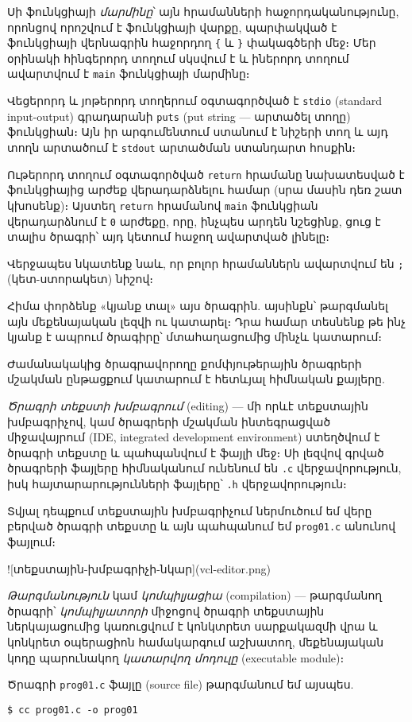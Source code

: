 Սի ֆունկցիայի \emph{մարմինը}՝ այն հրամանների հաջորդականությունը, որոնցով որոշվում է ֆունկցիայի վարքը, պարփակված է ֆունկցիայի վերնագրին հաջորդող \verb|{| և \verb|}| փակագծերի մեջ։ Մեր օրինակի հինգերորդ տողում սկսվում է և իներորդ տողում ավարտվում է \texttt{main} ֆունկցիայի մարմինը։

Վեցերորդ և յոթերորդ տողերում օգտագործված է \texttt{stdio} (standard input-output) գրադարանի \texttt{puts} (put string — արտածել տողը) ֆունկցիան։ Այն իր արգումենտում ստանում է նիշերի տող և այդ տողն արտածում է \texttt{stdout} արտածման ստանդարտ հոսքին։

Ութերորդ տողում օգտագործված \texttt{return} հրամանը նախատեսված է ֆունկցիայից արժեք վերադարձնելու համար (սրա մասին դեռ շատ կխոսենք)։ Այստեղ \texttt{return} հրամանով \texttt{main} ֆունկցիան վերադարձնում է \texttt{0} արժեքը, որը, ինչպես արդեն նշեցինք, ցուց է տալիս ծրագրի՝ այդ կետում հաջող ավարտված լինելը։

Վերջապես նկատենք նաև, որ բոլոր հրամաններն ավարտվում են \verb|;| (կետ-ստորակետ) նիշով։

Հիմա փորձենք «կյանք տալ» այս ծրագրին. այսինքն՝ թարգմանել այն մեքենայական լեզվի ու կատարել։ Դրա համար տեսնենք թե ինչ կյանք է ապրում ծրագիրը՝ մտահաղացումից մինչև կատարում։

Ժամանակակից ծրագրավորողը քոմփյութերային ծրագրերի մշակման ընթացքում կատարում է հետևյալ հիմնական քայլերը.

\emph{Ծրագրի տեքստի խմբագրում} (editing) --- մի որևէ տեքստային խմբագրիչով, կամ ծրագրերի մշակման ինտեգրացված միջավայրում (IDE, integrated development environment) ստեղծվում է ծրագրի տեքստը և պահպանվում է ֆայլի մեջ։ Սի լեզվով գրված ծրագրերի ֆայլերը հիմնականում ունենում են \texttt{.c} վերջավորություն, իսկ հայտարարությունների ֆայլերը՝ \texttt{.h} վերջավորություն։

Տվյալ դեպքում տեքստային խմբագրիչում ներմուծում եմ վերը բերված ծրագրի տեքստը և այն պահպանում եմ \texttt{prog01.c} անունով ֆայլում։

![տեքստային-խմբագրիչի-նկար](vcl-editor.png)

\emph{Թարգմանություն} կամ \emph{կոմպիլյացիա} (compilation) --- թարգմանող ծրագրի՝ \emph{կոմպիլյատորի} միջոցով ծրագրի տեքստային ներկայացումից կառուցվում է կոնկտրետ սարքակազմի վրա և կոնկրետ օպերացիոն համակարգում աշխատող, մեքենայական կոդը պարունակող \emph{կատարվող մոդուլը} (executable module)։

Ծրագրի \texttt{prog01.c} ֆայլը (source file) թարգմանում եմ այսպես.

\begin{verbatim}
$ cc prog01.c -o prog01
\end{verbatim}


